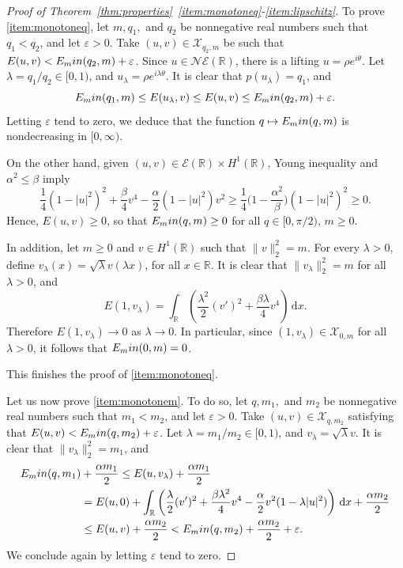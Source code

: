 \documentclass[10pt,a4paper]{amsart}
\newcommand{\Emin}{E_\textup{min}}
\newcommand{\NE}{\mathcal{NE}(\mathbb{R})}
\newcommand{\R}{\mathbb{R}}
\newcommand{\boE}{\mathcal{E}}
\newcommand{\boX}{\mathcal{X}}
\renewcommand{\d}{\,\mathrm{d}}
\begin{document}
\begin{proof}[Proof of Theorem~\ref{thm:properties}~\ref{item:monotoneq}-\ref{item:lipschitz}]
	To prove \ref{item:monotoneq}, let $m, q_1,$ and $q_2$ be nonnegative real numbers such that $q_1<q_2$, and let $\varepsilon>0$. Take $(u,v)\in\boX_{q_2,m}$ be such that $E(u,v)<\Emin(q_2,m)+\varepsilon$. Since $u\in\NE$, there is a lifting $u=\rho e^{i\theta}$.  Let $\lambda=q_1/q_2\in [0,1)$, and $u_\lambda=\rho e^{i\lambda\theta}$. It is clear that $p(u_\lambda)=q_1$, and
\[\Emin(q_1,m)\leq E(u_\lambda,v)\leq E(u,v)\leq\Emin(q_2,m)+\varepsilon.\]
Letting $\varepsilon$ tend to zero, we deduce that the function $q\mapsto \Emin(q,m)$ is nondecreasing in $[0,\infty)$. 

{On the other hand, given $(u,v)\in\boE(\R)\times H^1(\R)$, Young inequality and $\alpha^2\leq\beta$ imply
\begin{equation*}
\frac14(1-|u|^2)^2 + \frac{\beta}{4}v^4 -\frac{\alpha}{2}(1-|u|^2) v^2 \geq \frac14\Big(1-\frac{\alpha^2}{\beta}\Big)(1-|u|^2)^2 \geq 0.
\end{equation*}
Hence, $E(u,v)\geq 0$, so that $\Emin(q,m)\geq 0$ for all $q\in [0,\pi/2)$, $m\geq 0$. 

In addition, let $m\geq 0$ and $v\in H^1(\R)$ such that $\|v\|_2^2=m$. For every $\lambda>0$, define $v_\lambda(x)=\sqrt{\lambda}v(\lambda x)$, for all $x\in\R$. It is clear that $\|v_\lambda\|_2^2=m$ for all $\lambda>0$, and
\[E(1,v_\lambda)=\int_\R\left(\frac{\lambda^2}{2}(v')^2+\frac{\beta\lambda}{4}v^4\right)\d x.\]
Therefore $E(1,v_\lambda)\to 0$ as $\lambda\to 0$. In particular, since $(1,v_\lambda)\in\boX_{0,m}$ for all $\lambda>0$, it follows that $\Emin(0,m)=0$.} This finishes the proof of \ref{item:monotoneq}. 

Let us now prove \ref{item:monotonem}. To do so,  let $q, m_1,$ and $m_2$ be nonnegative real numbers such that $m_1<m_2$, and let $\varepsilon>0$. Take $(u,v)\in\boX_{q,m_2}$ satisfying that $E(u,v)<\Emin(q,m_2)+\varepsilon$. Let $\lambda=m_1/m_2\in [0,1)$, and $v_\lambda=\sqrt{\lambda}v$. It is clear that $\|v_\lambda\|^2_2=m_1$, and
\begin{align*}
	\Emin(q,m_1)&+\frac{\alpha m_1}{2}\leq E(u,v_\lambda)+\frac{\alpha m_1}{2}
\\ 
&=E(u,0)+\int_\R\left(\frac{\lambda}{2}(v')^2+\frac{\beta\lambda^2}{4}v^4-\frac{\alpha}{2}v^2(1-\lambda|u|^2)\right)\d x +\frac{\alpha m_2}{2}
\\
&\leq E(u,v)+\frac{\alpha m_2}{2}<\Emin(q,m_2)+\frac{\alpha m_2}{2}+\varepsilon.
\end{align*}
We conclude again by letting $\varepsilon$ tend to zero.



\end{proof}
\end{document}
